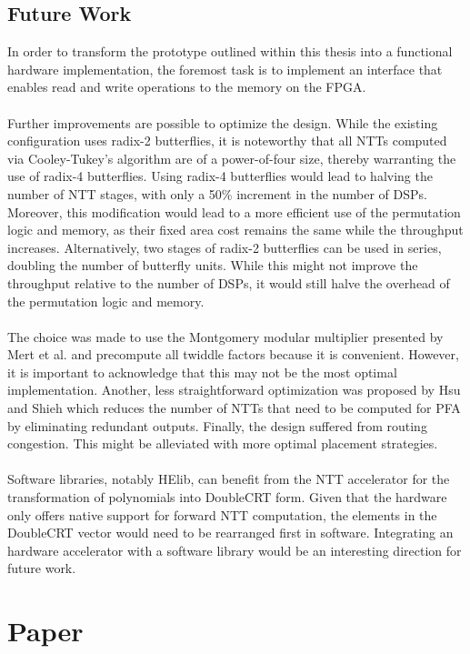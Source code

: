 \documentclass[english,master=eelt,masteroption=ec]{kulemt}
\begin{document}
\section{Future Work}
In order to transform the prototype outlined within this thesis into a functional hardware implementation, the foremost task is to implement an interface that enables read and write operations to the memory on the FPGA.
\\\\
Further improvements are possible to optimize the design. While the existing configuration uses radix-2 butterflies, it is noteworthy that all NTTs computed via Cooley-Tukey's algorithm are of a power-of-four size, thereby warranting the use of radix-4 butterflies. Using radix-4 butterflies would lead to halving the number of NTT stages, with only a 50\% increment in the number of DSPs. Moreover, this modification would lead to a more efficient use of the permutation logic and memory, as their fixed area cost remains the same while the throughput increases. Alternatively, two stages of radix-2 butterflies can be used in series, doubling the number of butterfly units. While this might not improve the throughput relative to the number of DSPs, it would still halve the overhead of the permutation logic and memory. 
\\\\
The choice was made to use the Montgomery modular multiplier presented by Mert et al. \cite{9171507} and precompute all twiddle factors because it is convenient. However, it is important to acknowledge that this may not be the most optimal implementation. Another, less straightforward optimization was proposed by Hsu and Shieh \cite{9181192} which reduces the number of NTTs that need to be computed for PFA by eliminating redundant outputs. Finally, the design suffered from routing congestion. This might be alleviated with more optimal placement strategies.
\\\\
Software libraries, notably HElib, can benefit from the NTT accelerator for the transformation of polynomials into DoubleCRT form. Given that the hardware only offers native support for forward NTT computation, the elements in the DoubleCRT vector would need to be rearranged first in software. Integrating an hardware accelerator with a software library would be an interesting direction for future work.

\appendixpage*
\appendix
\chapter{Paper}
  

\backmatter



\end{document}
